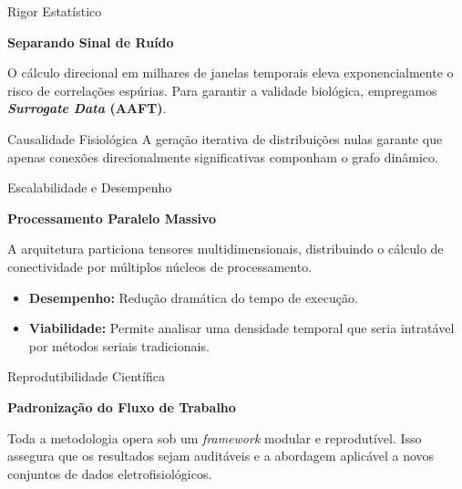 \documentclass[10pt]{beamer}
\begin{document}
\begin{frame}{Rigor Estatístico}
    \centering
    \vspace{1cm}
    
    \Large \textbf{Separando Sinal de Ruído}
    
    \vspace{0.8cm}
    \normalsize
    O cálculo direcional em milhares de janelas temporais eleva exponencialmente o risco de correlações espúrias. Para garantir a validade biológica, empregamos \textbf{\textit{Surrogate Data} (AAFT)}.
    
    \vspace{0.8cm}
    \begin{alertblock}{Causalidade Fisiológica}
        A geração iterativa de distribuições nulas garante que apenas conexões direcionalmente significativas componham o grafo dinâmico.
    \end{alertblock}
\end{frame}

\begin{frame}{Escalabilidade e Desempenho}
    \centering
    \vspace{1cm}
    
    \Large \textbf{Processamento Paralelo Massivo}
    
    \vspace{1cm}
    \normalsize
    A arquitetura particiona tensores multidimensionais, distribuindo o cálculo de conectividade por múltiplos núcleos de processamento.
    
    \vspace{0.8cm}
    \begin{itemize}
        \item \textbf{Desempenho:} Redução dramática do tempo de execução.
        \item \textbf{Viabilidade:} Permite analisar uma densidade temporal que seria intratável por métodos seriais tradicionais.
    \end{itemize}
\end{frame}

\begin{frame}{Reprodutibilidade Científica}
    \centering
    \vspace{1.5cm}
    
    \Large \textbf{Padronização do Fluxo de Trabalho}
    
    \vspace{1cm}
    \normalsize
    Toda a metodologia opera sob um \textit{framework} modular e reprodutível. Isso assegura que os resultados sejam auditáveis e a abordagem aplicável a novos conjuntos de dados eletrofisiológicos.
\end{frame}
\end{document}
